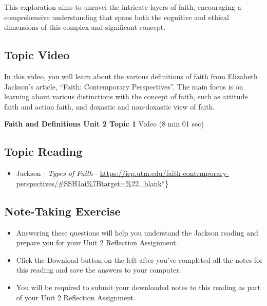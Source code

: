 \documentclass[
]{book}
\providecommand{\tightlist}{%
  \setlength{\itemsep}{0pt}\setlength{\parskip}{0pt}}
\begin{document}
This exploration aims to unravel the intricate layers of faith, encouraging a comprehensive understanding that spans both the cognitive and ethical dimensions of this complex and significant concept.

\hypertarget{topic-video}{%
\subsection*{Topic Video}\label{topic-video}}

In this video, you will learn about the various definitions of faith from Elizabeth Jackson's article, ``Faith: Contemporary Perspectives''. The main focus is on learning about various distinctions with the concept of faith, such as attitude faith and action faith, and doxastic and non-doxastic view of faith.

\textbf{Faith and Definitions Unit 2 Topic 1} Video (8 min 01 sec)

\hypertarget{topic-reading}{%
\subsection*{Topic Reading}\label{topic-reading}}

\begin{itemize}
\tightlist
\item
  Jackson - \emph{Types of Faith} - \url{https://iep.utm.edu/faith-contemporary-perspectives/\#SSH1ai\%7Btarget=\%22_blank}``\}
\end{itemize}

\hypertarget{note-taking-exercise}{%
\subsection*{Note-Taking Exercise}\label{note-taking-exercise}}

\begin{reflect}
\begin{itemize}
\tightlist
\item
  Answering these questions will help you understand the Jackson reading and prepare you for your Unit 2 Reflection Assignment.
\item
  Click the Download button on the left after you've completed all the notes for this reading and save the answers to your computer.
\item
  You will be required to submit your downloaded notes to this reading as part of your Unit 2 Reflection Assignment.
\end{itemize}
\end{reflect}
\end{document}
